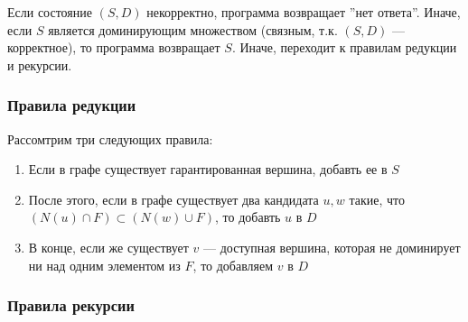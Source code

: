 Если состояние \((S, D)\) некорректно, программа возвращает ''нет ответа''. Иначе, если \(S\) является доминирующим множеством (связным, т.к. \((S, D)\) --- корректное), то программа возвращает \(S\). Иначе, переходит к правилам редукции и рекурсии.

\subsubsection{Правила редукции}

Рассомтрим три следующих правила:
\begin{enumerate}[label=\alph*]
    \item Если в графе существует гарантированная вершина, добавть ее в \(S\)
    \item После этого, если в графе существует два кандидата \(u, w\) такие, что \((N(u) \cap F) \subset (N(w) \cup F)\), то добавть \(u\) в \(D\)
    \item В конце, если же существует \(v\) --- доступная вершина, которая не доминирует ни над одним элементом из \(F\), то добавляем \(v\) в \(D\)
\end{enumerate}

\subsubsection{Правила рекурсии}

